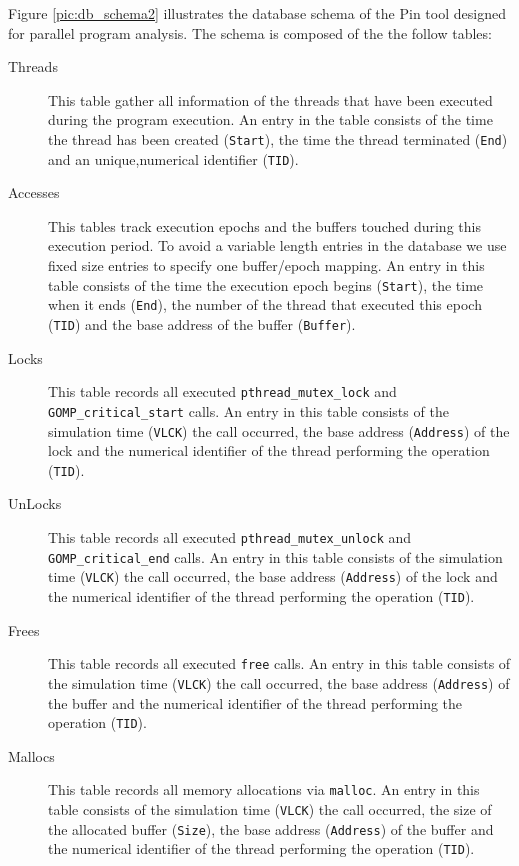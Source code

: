 Figure \ref{pic:db_schema2} illustrates the database
schema of the Pin tool designed for parallel program analysis.
The schema is composed of the the follow tables:
\begin{description}
  \item[Threads] This table gather all information of the threads that
    have been executed during the program execution. An entry in the
    table consists of the time the thread has been created
    (\texttt{Start}), the time the thread terminated (\texttt{End}) and
    an unique,numerical identifier (\texttt{TID}).
  \item[Accesses] This tables track execution epochs and the buffers
    touched during this execution period. To avoid a variable length
    entries in the database we use fixed size entries to specify one
    buffer/epoch mapping. An entry in this table consists of the time
    the execution epoch begins (\texttt{Start}), the time when it ends
    (\texttt{End}), the number of the thread that executed this epoch
    (\texttt{TID}) and the base address of the buffer
    (\texttt{Buffer}).
  \item[Locks] This table records all executed 
    \texttt{pthread\_mutex\_lock} and
    \texttt{GOMP\_critical\_start} calls. An entry in this table
    consists of the simulation time (\texttt{VLCK}) the call occurred,
    the base address (\texttt{Address}) of the lock and the
    numerical identifier of the thread performing the operation
    (\texttt{TID}).
  \item[UnLocks] This table records all executed
    \texttt{pthread\_mutex\_unlock} and
    \texttt{GOMP\_critical\_end} calls. An entry in this table
    consists of the simulation time (\texttt{VLCK}) the call occurred,
    the base address (\texttt{Address}) of the lock and the
    numerical identifier of the thread performing the operation
    (\texttt{TID}).
  \item[Frees] This table records all executed \texttt{free} calls. An
    entry in this table consists of the simulation time
    (\texttt{VLCK}) the call occurred, the base address
    (\texttt{Address}) of the buffer and the numerical identifier of
    the thread performing the operation (\texttt{TID}).
  \item[Mallocs] This table records all memory allocations via
    \texttt{malloc}. An entry in this table consists of the simulation
    time (\texttt{VLCK}) the call occurred, the size of the allocated
    buffer (\texttt{Size}), the base address (\texttt{Address}) of
    the buffer and the numerical identifier of
    the thread performing the operation (\texttt{TID}).
\end{description}

